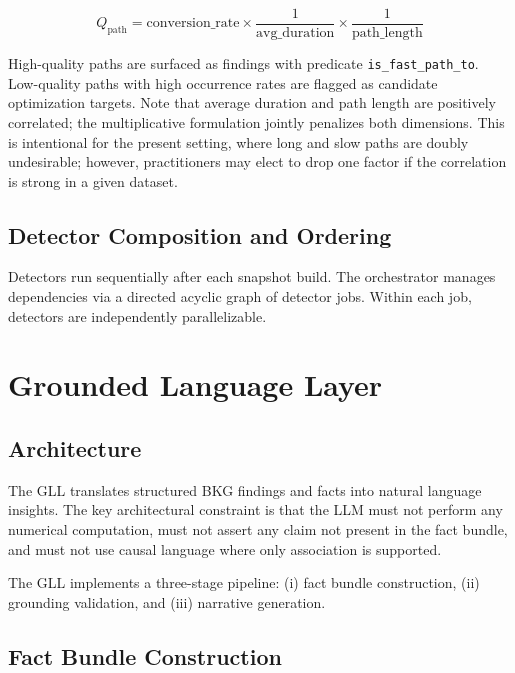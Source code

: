\documentclass[12pt, a4paper]{article}
\begin{document}
\begin{equation}
  Q_{\text{path}} = \text{conversion\_rate} \times \frac{1}{\text{avg\_duration}} \times \frac{1}{\text{path\_length}}
  \label{eq:pathquality}
\end{equation}

High-quality paths are surfaced as findings with predicate \texttt{is\_fast\_path\_to}. Low-quality paths with high occurrence rates are flagged as candidate optimization targets. Note that average duration and path length are positively correlated; the multiplicative formulation jointly penalizes both dimensions. This is intentional for the present setting, where long and slow paths are doubly undesirable; however, practitioners may elect to drop one factor if the correlation is strong in a given dataset.

\subsection{Detector Composition and Ordering}

Detectors run sequentially after each snapshot build. The orchestrator manages dependencies via a directed acyclic graph of detector jobs. Within each job, detectors are independently parallelizable.

\section{Grounded Language Layer}
\label{sec:gll}

\subsection{Architecture}

The GLL translates structured BKG findings and facts into natural language insights. The key architectural constraint is that the LLM must not perform any numerical computation, must not assert any claim not present in the fact bundle, and must not use causal language where only association is supported.

The GLL implements a three-stage pipeline: (i) fact bundle construction, (ii) grounding validation, and (iii) narrative generation.

\subsection{Fact Bundle Construction}
\end{document}
